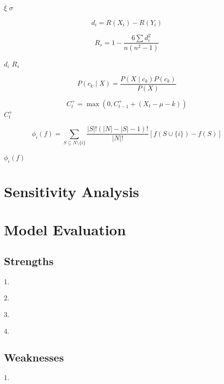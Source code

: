 \documentclass[12pt]{article}  %
\begin{document}
$\overline{\xi}$
$\sigma$


\begin{equation}
	d_i = R(X_i) - R(Y_i)
\end{equation}

\begin{equation}
	R_s = 1 - \frac{6 \sum d_i^2}{n(n^2 - 1)}
\end{equation}

$d_i$
$R_s$


\begin{equation}
	P(c_k \mid X) = \frac{P(X \mid c_k) P(c_k)}{P(X)}
\end{equation}



\begin{equation}
	C_t^+ = \max(0, C_{t-1}^+ + (X_t - \mu - k))
\end{equation}
$C_t^+ $







	
	\begin{equation}
		\phi_i(f) = \sum_{S \subseteq N \setminus \{i\}} \frac{|S|!(|N| - |S| - 1)!}{|N|!} [f(S \cup \{i\}) - f(S)]
	\end{equation}



$\phi_i(f)$















\section{Sensitivity Analysis}

\section{Model Evaluation}
\subsection{Strengths}
1.

2. 

3. 

4. 
\subsection{Weaknesses}
1.
\end{document}

